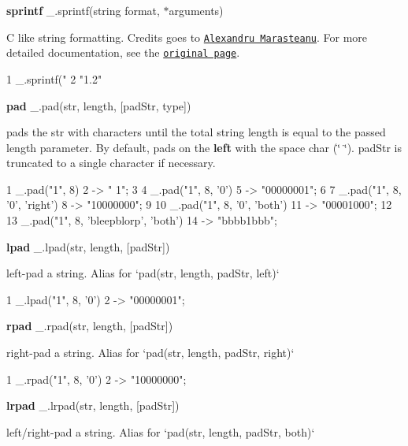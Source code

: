 {\bfseries sprintf} \+\_\+.\+sprintf(string format, $\ast$arguments)

C like string formatting. Credits goes to \href{http://www.diveintojavascript.com/projects/sprintf-for-javascript}{\tt Alexandru Marasteanu}. For more detailed documentation, see the \href{http://www.diveintojavascript.com/projects/sprintf-for-javascript}{\tt original page}.


\begin{DoxyCode}
1 \_.sprintf("%
2 "1.2"
\end{DoxyCode}


{\bfseries pad} \+\_\+.\+pad(str, length, \mbox{[}pad\+Str, type\mbox{]})

pads the {\ttfamily str} with characters until the total string length is equal to the passed {\ttfamily length} parameter. By default, pads on the {\bfseries left} with the space char ({\ttfamily \char`\"{} \char`\"{}}). {\ttfamily pad\+Str} is truncated to a single character if necessary.


\begin{DoxyCode}
1 \_.pad("1", 8)
2 -> "       1";
3 
4 \_.pad("1", 8, '0')
5 -> "00000001";
6 
7 \_.pad("1", 8, '0', 'right')
8 -> "10000000";
9 
10 \_.pad("1", 8, '0', 'both')
11 -> "00001000";
12 
13 \_.pad("1", 8, 'bleepblorp', 'both')
14 -> "bbbb1bbb";
\end{DoxyCode}


{\bfseries lpad} \+\_\+.\+lpad(str, length, \mbox{[}pad\+Str\mbox{]})

left-\/pad a string. Alias for `pad(str, length, pad\+Str, \textquotesingle{}left\textquotesingle{})`


\begin{DoxyCode}
1 \_.lpad("1", 8, '0')
2 -> "00000001";
\end{DoxyCode}


{\bfseries rpad} \+\_\+.\+rpad(str, length, \mbox{[}pad\+Str\mbox{]})

right-\/pad a string. Alias for `pad(str, length, pad\+Str, \textquotesingle{}right\textquotesingle{})`


\begin{DoxyCode}
1 \_.rpad("1", 8, '0')
2 -> "10000000";
\end{DoxyCode}


{\bfseries lrpad} \+\_\+.\+lrpad(str, length, \mbox{[}pad\+Str\mbox{]})

left/right-\/pad a string. Alias for `pad(str, length, pad\+Str, \textquotesingle{}both\textquotesingle{})`


